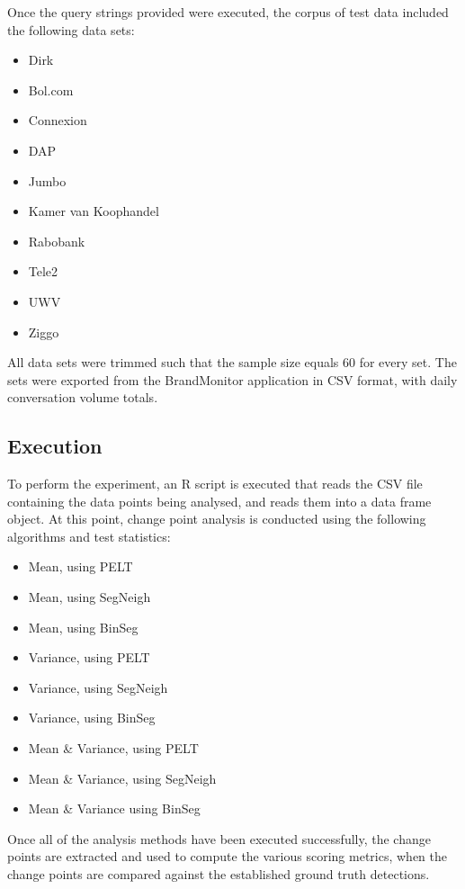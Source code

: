 \documentclass[../main.tex]{subfiles}
\begin{document}
Once the query strings provided were executed, the corpus of test data included the following data sets:

\begin{itemize}
    \item Dirk
    \item Bol.com
    \item Connexion
    \item DAP
    \item Jumbo
    \item Kamer van Koophandel
    \item Rabobank
    \item Tele2
    \item UWV
    \item Ziggo
\end{itemize}

All data sets were trimmed such that the sample size equals 60 for every set. The sets were exported from the BrandMonitor application in CSV format, with daily conversation volume totals.

\subsection{Execution}

To perform the experiment, an \textsf{R} script is executed that reads the CSV file containing the data points being analysed, and reads them into a data frame object. At this point, change point analysis is conducted using the following algorithms and test statistics:

\begin{itemize}
    \item Mean, using PELT
    \item Mean, using SegNeigh
    \item Mean, using BinSeg
    \item Variance, using PELT
    \item Variance, using SegNeigh
    \item Variance, using BinSeg
    \item Mean \& Variance, using PELT
    \item Mean \& Variance, using SegNeigh
    \item Mean \& Variance using BinSeg
\end{itemize}

Once all of the analysis methods have been executed successfully, the change points are extracted and used to compute the various scoring metrics, when the change points are compared against the established ground truth detections.
\end{document}

